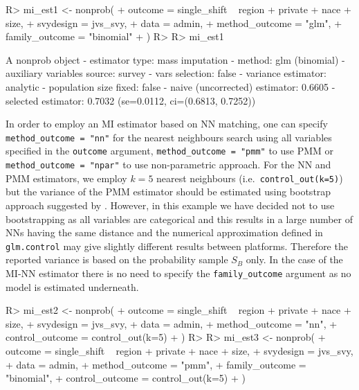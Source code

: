 \documentclass[
]{jss}
\begin{document}
\begin{CodeChunk}
\begin{CodeInput}
R> mi_est1 <- nonprob(
+   outcome = single_shift ~ region + private + nace + size,
+   svydesign = jvs_svy,
+   data = admin,
+   method_outcome = "glm",
+   family_outcome = "binomial"
+ )
R> 
R> mi_est1
\end{CodeInput}
\begin{CodeOutput}
A nonprob object
 - estimator type: mass imputation
 - method: glm (binomial)
 - auxiliary variables source: survey
 - vars selection: false
 - variance estimator: analytic
 - population size fixed: false
 - naive (uncorrected) estimator: 0.6605
 - selected estimator: 0.7032 (se=0.0112, ci=(0.6813, 0.7252))
\end{CodeOutput}
\end{CodeChunk}

In order to employ an MI estimator based on NN matching, one can specify
\texttt{method\_outcome\ =\ "nn"} for the nearest neighbours search
using all variables specified in the \texttt{outcome} argument,
\texttt{method\_outcome\ =\ "pmm"} to use PMM or
\texttt{method\_outcome\ =\ "npar"} to use non-parametric approach. For
the NN and PMM estimators, we employ \(k=5\) nearest neighbours
(i.e.~\texttt{control\_out(k=5)}) but the variance of the PMM estimator
should be estimated using bootstrap approach suggested by
\citet{chlebicki2025}. However, in this example we have decided not to
use bootstrapping as all variables are categorical and this results in a
large number of NNs having the same distance and the numerical
approximation defined in \texttt{glm.control} may give slightly
different results between platforms. Therefore the reported variance is
based on the probability sample \(S_B\) only. In the case of the MI-NN
estimator there is no need to specify the \texttt{family\_outcome}
argument as no model is estimated underneath.

\begin{CodeChunk}
\begin{CodeInput}
R> mi_est2 <- nonprob(
+   outcome = single_shift ~ region + private + nace + size,
+   svydesign = jvs_svy,
+   data = admin,
+   method_outcome = "nn",
+   control_outcome = control_out(k=5)
+ )
R> 
R> mi_est3 <- nonprob(
+   outcome = single_shift ~ region + private + nace + size,
+   svydesign = jvs_svy,
+   data = admin,
+   method_outcome = "pmm",
+   family_outcome = "binomial", 
+   control_outcome = control_out(k=5)
+ )
\end{CodeInput}
\end{CodeChunk}
\end{document}
